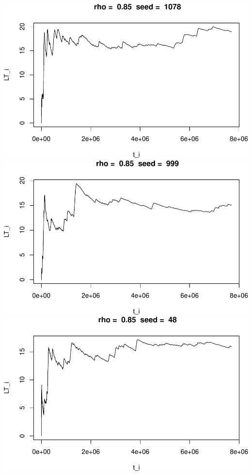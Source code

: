 \documentclass[]{article}
\begin{document}
\includegraphics{003_files/figure-latex/unnamed-chunk-19-4.pdf}
\includegraphics{003_files/figure-latex/unnamed-chunk-19-5.pdf}
\includegraphics{003_files/figure-latex/unnamed-chunk-19-6.pdf}
\end{document}
